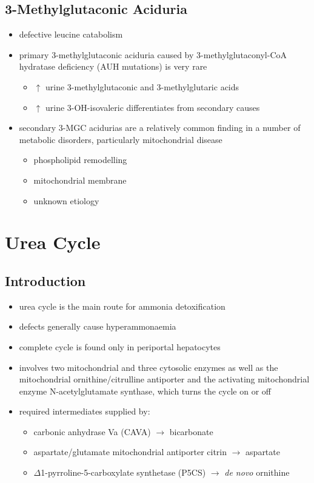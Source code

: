 \documentclass{scrartcl}
\begin{document}
\subsection{3-Methylglutaconic Aciduria}
\label{sec:orgd230cd7}
\begin{itemize}
\item defective leucine catabolism
\item primary 3-methylglutaconic aciduria caused by 3-methylglutaconyl-CoA
hydratase deficiency (AUH mutations) is very rare
\begin{itemize}
\item \(\uparrow\) urine 3-methylglutaconic and 3-methylglutaric acids
\item \(\uparrow\) urine 3-OH-isovaleric differentiates from secondary causes
\end{itemize}
\item secondary 3-MGC acidurias are a relatively common finding in a
number of metabolic disorders, particularly mitochondrial disease
\begin{itemize}
\item phospholipid remodelling
\item mitochondrial membrane
\item unknown etiology
\end{itemize}
\end{itemize}

\section{Urea Cycle}
\label{sec:orgf4362d3}
\subsection{Introduction}
\label{sec:org3458dd4}
\begin{itemize}
\item urea cycle is the main route for ammonia detoxification
\item defects generally cause hyperammonaemia
\item complete cycle is found only in periportal hepatocytes
\item involves two mitochondrial and three cytosolic enzymes as well as
the mitochondrial ornithine/citrulline antiporter and the activating
mitochondrial enzyme N-acetylglutamate synthase, which turns the
cycle on or off
\item required intermediates supplied by:
\begin{itemize}
\item carbonic anhydrase Va (CAVA) \(\to\) bicarbonate
\item aspartate/glutamate mitochondrial antiporter citrin \(\to\) aspartate
\item \(\Delta\)1-pyrroline-5-carboxylate synthetase (P5CS) \(\to\) \emph{de novo} ornithine
\end{itemize}
\end{itemize}
\end{document}
